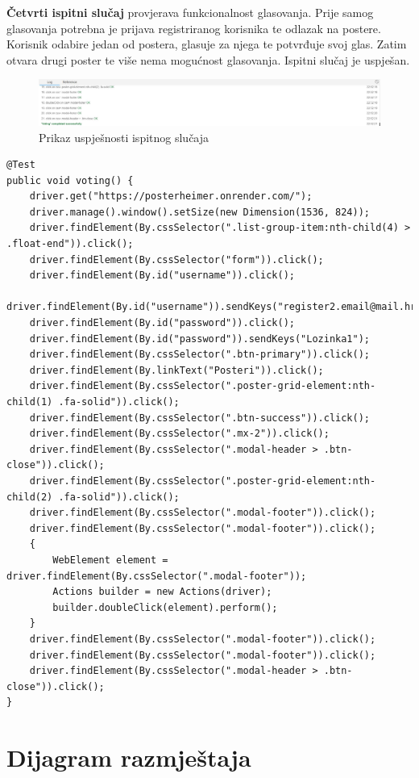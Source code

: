 		\textbf{Četvrti ispitni slučaj} provjerava funkcionalnost glasovanja. Prije samog glasovanja potrebna je prijava registriranog korisnika te odlazak na postere. Korisnik odabire jedan od postera, glasuje za njega te potvrđuje svoj glas. Zatim otvara drugi poster te više nema mogućnost glasovanja. Ispitni slučaj je uspješan.
		\begin{figure} [hbt!]
			\includegraphics[width=\linewidth]{Slike/votingTest}
			\caption{Prikaz uspješnosti ispitnog slučaja}
		\end{figure}
		
		\begin{lstlisting}
@Test
public void voting() {
	driver.get("https://posterheimer.onrender.com/");
	driver.manage().window().setSize(new Dimension(1536, 824));
	driver.findElement(By.cssSelector(".list-group-item:nth-child(4) > .float-end")).click();
	driver.findElement(By.cssSelector("form")).click();
	driver.findElement(By.id("username")).click();
	driver.findElement(By.id("username")).sendKeys("register2.email@mail.hr");
	driver.findElement(By.id("password")).click();
	driver.findElement(By.id("password")).sendKeys("Lozinka1");
	driver.findElement(By.cssSelector(".btn-primary")).click();
	driver.findElement(By.linkText("Posteri")).click();
	driver.findElement(By.cssSelector(".poster-grid-element:nth-child(1) .fa-solid")).click();
	driver.findElement(By.cssSelector(".btn-success")).click();
	driver.findElement(By.cssSelector(".mx-2")).click();
	driver.findElement(By.cssSelector(".modal-header > .btn-close")).click();
	driver.findElement(By.cssSelector(".poster-grid-element:nth-child(2) .fa-solid")).click();
	driver.findElement(By.cssSelector(".modal-footer")).click();
	driver.findElement(By.cssSelector(".modal-footer")).click();
	{
		WebElement element = driver.findElement(By.cssSelector(".modal-footer"));
		Actions builder = new Actions(driver);
		builder.doubleClick(element).perform();
	}
	driver.findElement(By.cssSelector(".modal-footer")).click();
	driver.findElement(By.cssSelector(".modal-footer")).click();
	driver.findElement(By.cssSelector(".modal-header > .btn-close")).click();
}
		\end{lstlisting}
			
			\eject 
		
		
		\section{Dijagram razmještaja}
			

